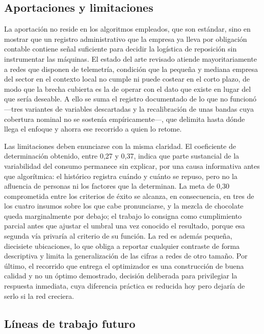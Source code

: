 \subsection{Aportaciones y limitaciones}\label{aportaciones-y-limitaciones}

La aportación no reside en los algoritmos empleados, que son estándar, sino en mostrar que un registro administrativo que la empresa ya lleva por obligación contable contiene señal suficiente para decidir la logística de reposición sin instrumentar las máquinas. El estado del arte revisado atiende mayoritariamente a redes que disponen de telemetría, condición que la pequeña y mediana empresa del sector en el contexto local no cumple ni puede costear en el corto plazo, de modo que la brecha cubierta es la de operar con el dato que existe en lugar del que sería deseable. A ello se suma el registro documentado de lo que no funcionó —tres variantes de variables descartadas y la recalibración de unas bandas cuya cobertura nominal no se sostenía empíricamente—, que delimita hasta dónde llega el enfoque y ahorra ese recorrido a quien lo retome.

Las limitaciones deben enunciarse con la misma claridad. El coeficiente de determinación obtenido, entre 0,27 y 0,37, indica que parte sustancial de la variabilidad del consumo permanece sin explicar, por una causa informativa antes que algorítmica: el histórico registra cuándo y cuánto se repuso, pero no la afluencia de personas ni los factores que la determinan. La meta de 0,30 comprometida entre los criterios de éxito se alcanza, en consecuencia, en tres de los cuatro insumos sobre los que cabe pronunciarse, y la mezcla de chocolate queda marginalmente por debajo; el trabajo lo consigna como cumplimiento parcial antes que ajustar el umbral una vez conocido el resultado, porque esa segunda vía privaría al criterio de su función. La red es además pequeña, diecisiete ubicaciones, lo que obliga a reportar cualquier contraste de forma descriptiva y limita la generalización de las cifras a redes de otro tamaño. Por último, el recorrido que entrega el optimizador es una construcción de buena calidad y no un óptimo demostrado, decisión deliberada para privilegiar la respuesta inmediata, cuya diferencia práctica es reducida hoy pero dejaría de serlo si la red creciera.

\subsection{Líneas de trabajo futuro}\label{lineas-de-trabajo-futuro}

